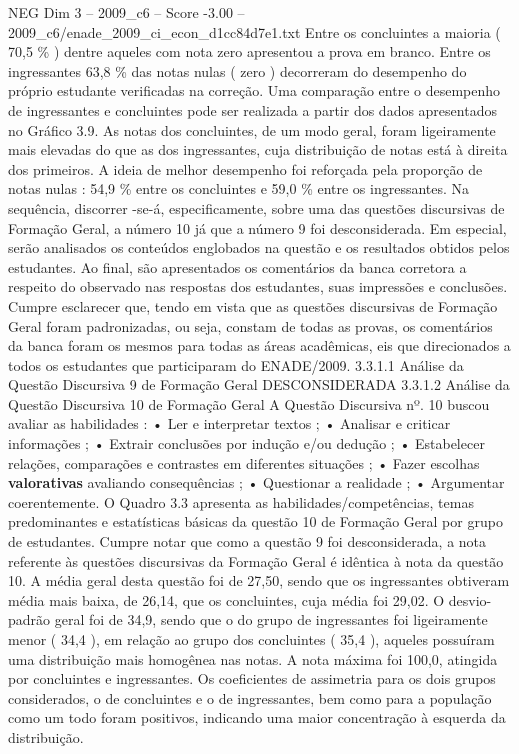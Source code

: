 \begin{textsample}{NEG Dim 3 – 2009\_c6 – Score -3.00 – 2009\_c6/enade\_2009\_ci\_econ\_d1cc84d7e1.txt}
Entre os concluintes a maioria ( 70,5 \% ) dentre aqueles com nota zero apresentou a prova em branco.
Entre os ingressantes 63,8 \% das notas nulas ( zero ) decorreram do desempenho do próprio estudante verificadas na correção.
Uma comparação entre o desempenho de ingressantes e concluintes pode ser realizada a partir dos dados apresentados no Gráfico 3.9.
As notas dos concluintes, de um modo geral, foram ligeiramente mais elevadas do que as dos ingressantes, cuja distribuição de notas está à direita dos primeiros.
A ideia de melhor desempenho foi reforçada pela proporção de notas nulas : 54,9 \% entre os concluintes e 59,0 \% entre os ingressantes.
Na sequência, discorrer -se-á, especificamente, sobre uma das questões discursivas de Formação Geral, a número 10 já que a número 9 foi desconsiderada.
Em especial, serão analisados os conteúdos englobados na questão e os resultados obtidos pelos estudantes.
Ao final, são apresentados os comentários da banca corretora a respeito do observado nas respostas dos estudantes, suas impressões e conclusões.
Cumpre esclarecer que, tendo em vista que as questões discursivas de Formação Geral foram padronizadas, ou seja, constam de todas as provas, os comentários da banca foram os mesmos para todas as áreas acadêmicas, eis que direcionados a todos os estudantes que participaram do ENADE/2009. 3.3.1.1 Análise da Questão Discursiva 9 de Formação Geral DESCONSIDERADA 3.3.1.2 Análise da Questão Discursiva 10 de Formação Geral A Questão Discursiva nº. 10 buscou avaliar as habilidades : • Ler e interpretar textos ; • Analisar e criticar informações ; • Extrair conclusões por indução e/ou dedução ; • Estabelecer relações, comparações e contrastes em diferentes situações ; • Fazer escolhas \textbf{valorativas} avaliando consequências ; • Questionar a realidade ; • Argumentar coerentemente.
O Quadro 3.3 apresenta as habilidades/competências, temas predominantes e estatísticas básicas da questão 10 de Formação Geral por grupo de estudantes.
Cumpre notar que como a questão 9 foi desconsiderada, a nota referente às questões discursivas da Formação Geral é idêntica à nota da questão 10.
A média geral desta questão foi de 27,50, sendo que os ingressantes obtiveram média mais baixa, de 26,14, que os concluintes, cuja média foi 29,02.
O desvio-padrão geral foi de 34,9, sendo que o do grupo de ingressantes foi ligeiramente menor ( 34,4 ), em relação ao grupo dos concluintes ( 35,4 ), aqueles possuíram uma distribuição mais homogênea nas notas.
A nota máxima foi 100,0, atingida por concluintes e ingressantes.
Os coeficientes de assimetria para os dois grupos considerados, o de concluintes e o de ingressantes, bem como para a população como um todo foram positivos, indicando uma maior concentração à esquerda da distribuição.

\end{textsample}
